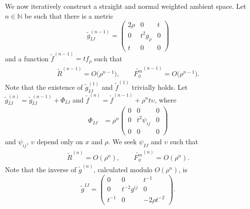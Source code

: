\documentclass[10pt,a4paper]{amsart}
\newcommand{\cg}{\widetilde{g}}
\numberwithin{equation}{section}
\begin{document}
We now iteratively construct a straight and normal weighted ambient space.
Let $n\in\mathbb{N}$ be such that there is a metric
\[
\widetilde{g}_{IJ}^{(n-1)} = \begin{pmatrix}
2\rho & 0 & t \\
0 & t^2 g_{\rho} & 0 \\
t & 0 & 0
\end{pmatrix}
\]
and a function $\widetilde{f}^{(n-1)}=tf_\rho$ such that
\begin{gather*}
\widetilde{R}^{(n-1)}=O\big(\rho^{n-1}\big),
\qquad
\widetilde{F_{\phi}^m}^{(n-1)}=O\big(\rho^{n-1}\big).
\end{gather*}
Note that the existence of $\widetilde{g}_{IJ}^{(1)}$ and $\widetilde{f}^{(1)}$ trivially holds. Let $\cg^{(n)}_{IJ}=\cg^{(n-1)}_{IJ}+\Phi_{IJ}$ and $\widetilde{f}^{(n)}= \widetilde{f}^{(n-1)}+\rho^{n}t\upsilon$, where
\begin{align*}
\Phi_{IJ}&= \rho^n \begin{pmatrix}
0 & 0 & 0 \\
0 & t^2\psi_{ij} & 0 \\
0 & 0 & 0
\end{pmatrix}
\end{align*}
and $\psi_{ij}$, $\upsilon$ depend only on $x$ and $\rho$.
We seek $\psi_{IJ}$ and $\upsilon$ such that
 \begin{gather*}
\widetilde{R}^{(n)}= O(\rho^{n}),
\qquad
\widetilde{F_{\phi}^m}^{(n)} = O(\rho^{n}).
\end{gather*}
Note that the inverse of $\cg^{(n)}$, calculated modulo $O(\rho^n)$, is
\[
\cg^{IJ} = \begin{pmatrix} 0 & 0 & t^{-1}\\ 0 & t^{-2}g^{ij}& 0\\ t^{-1} & 0 & -{2\rho}t^{-2}\end{pmatrix}\!.
\]
\end{document}
